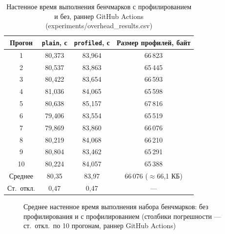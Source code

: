 \begin{table}[htbp]
\caption{Настенное время выполнения бенчмарков с профилированием и без, раннер GitHub Actions (experiments/overhead\_results.csv)}
\label{tab:5.3}
\centering
\begin{tabular}{cccc}
\toprule
Прогон & \texttt{plain}, с & \texttt{profiled}, с & Размер профилей, байт \\
\midrule
1  & 80,373 & 83,964 & 66\,823 \\
2  & 80,537 & 83,863 & 65\,445 \\
3  & 80,422 & 83,654 & 66\,593 \\
4  & 81,036 & 84,065 & 65\,598 \\
5  & 80,638 & 85,157 & 67\,816 \\
6  & 79,406 & 83,554 & 65\,519 \\
7  & 79,869 & 83,860 & 66\,076 \\
8  & 80,219 & 84,068 & 66\,210 \\
9  & 80,804 & 83,462 & 65\,291 \\
10 & 80,224 & 84,057 & 65\,388 \\
\midrule
Среднее & 80,35 & 83,97 & 66\,076 ($\approx$66,1 КБ) \\
Ст.\ откл. & 0,47 & 0,47 & --- \\
\bottomrule
\end{tabular}
\end{table}

\begin{figure}[htbp]
\centering
{}
\caption{Среднее настенное время выполнения набора бенчмарков: без профилирования и с профилированием (столбики погрешности --- ст.\ откл.\ по 10 прогонам, раннер GitHub Actions)}
\label{fig:5.1}
\end{figure}

